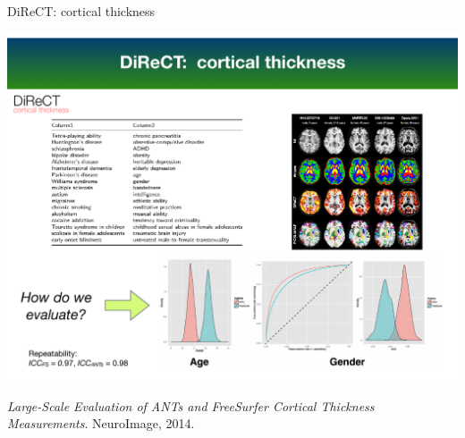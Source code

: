\documentclass[ignorenonframetext,]{beamer}
\begin{document}
\begin{frame}{DiReCT: cortical thickness}

\usebackgroundtemplate{\texttt{[image: ]}}

\vspace*{-.225cm} \hspace*{-.5cm}
\includegraphics[width=1.085\textwidth,height=0.825\textheight]{../../Figures/direct.pdf}

\tiny

\begin{flushright}
{\em Large-Scale Evaluation of ANTs and FreeSurfer Cortical Thickness Measurements}. NeuroImage, 2014.
\end{flushright}

\end{frame}
\end{document}
